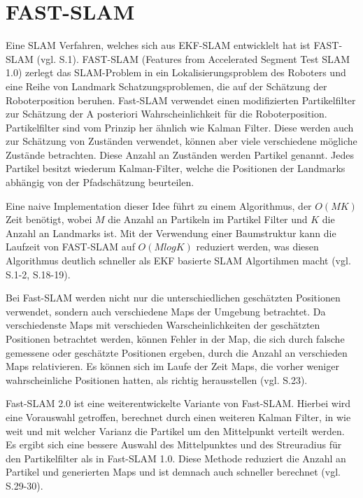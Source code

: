 \section{FAST-SLAM}
Eine SLAM Verfahren, welches sich aus EKF-SLAM entwicklelt hat ist FAST-SLAM (vgl. \cite{orb_slam} S.1). FAST-SLAM (Features from Accelerated Segment Test SLAM 1.0) zerlegt das SLAM-Problem in ein Lokalisierungsproblem des Roboters und eine Reihe von Landmark Schatzungsproblemen, die auf der Schätzung der Roboterposition beruhen. Fast-SLAM verwendet einen modifizierten Partikelfilter zur Schätzung der \glqq A posteriori\grqq{} Wahrscheinlichkeit für die Roboterposition. Partikelfilter sind vom Prinzip her ähnlich wie Kalman Filter. Diese werden auch zur Schätzung von Zuständen verwendet, können aber viele verschiedene mögliche Zustände betrachten. Diese Anzahl an Zuständen werden Partikel genannt. Jedes Partikel besitzt wiederum Kalman-Filter, welche die Positionen der Landmarks abhängig von der Pfadschätzung beurteilen.

Eine naive Implementation dieser Idee führt zu einem Algorithmus, der \(O(MK)\) Zeit benötigt, wobei \(M\) die Anzahl an Partikeln im Partikel Filter und \( K\) die Anzahl an Landmarks ist. Mit der Verwendung einer Baumstruktur kann die Laufzeit von FAST-SLAM auf \(O(MlogK)\) reduziert werden, was diesen Algorithmus deutlich schneller als EKF basierte SLAM Algortihmen macht (vgl. \cite{ekf_problems} S.1-2, \cite{slam_studi} S.18-19).

Bei Fast-SLAM werden nicht nur die unterschiedlichen geschätzten Positionen verwendet, sondern auch verschiedene Maps der Umgebung betrachtet. Da verschiedenste Maps mit verschieden Warscheinlichkeiten der geschätzten Positionen betrachtet werden, können Fehler in der Map, die sich durch falsche gemessene oder geschätzte Positionen ergeben, durch die Anzahl an verschieden Maps relativieren. Es können sich im Laufe der Zeit Maps, die vorher weniger wahrscheinliche Positionen hatten, als richtig herausstellen (vgl.  \cite{slam_studi} S.23).

Fast-SLAM 2.0 ist eine weiterentwickelte Variante von Fast-SLAM. Hierbei wird eine Vorauswahl getroffen, berechnet durch einen weiteren Kalman Filter, in wie weit und mit welcher Varianz die Partikel um den Mittelpunkt verteilt werden. Es ergibt sich eine bessere Auswahl des Mittelpunktes und des Streuradius für den Partikelfilter als in Fast-SLAM 1.0. Diese Methode reduziert die Anzahl an Partikel und generierten Maps und ist demnach auch schneller berechnet (vgl. \cite{slam_studi} S.29-30).

